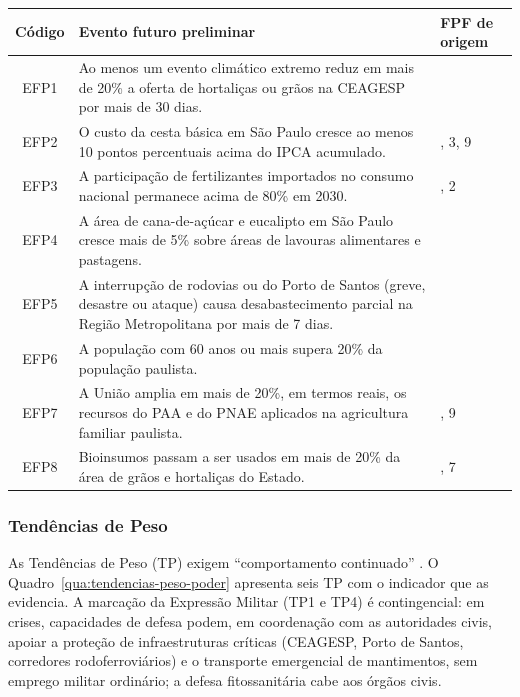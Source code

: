 \documentclass[
	12pt,				%
	openright,			%
	oneside,			%
	a4paper,			%
	chapter=TITLE,		%
	section=TITLE,		%
	english,			%
	french,				%
	spanish,			%
	brazil,				%
 ]{abntex2}
\begin{document}
\begin{quadro}[!htbp]
\centering
\caption{Eventos futuros preliminares, horizonte 2027--2030}
\label{qua:eventos-futuros-preliminares}
\footnotesize
\renewcommand{\arraystretch}{1.05}
\setlength{\tabcolsep}{3pt}
\begin{tabularx}{\textwidth}{|c|>{\raggedright\arraybackslash}X|>{\centering\arraybackslash}p{1.4cm}|}
\hline
\textbf{Código} & \textbf{Evento futuro preliminar} & \textbf{FPF de origem} \\
\hline
EFP1 & Ao menos um evento climático extremo reduz em mais de 20\% a oferta de hortaliças ou grãos na CEAGESP por mais de 30 dias. & 3 \\
\hline
EFP2 & O custo da cesta básica em São Paulo cresce ao menos 10 pontos percentuais acima do IPCA acumulado. & 1, 3, 9 \\
\hline
EFP3 & A participação de fertilizantes importados no consumo nacional permanece acima de 80\% em 2030. & 1, 2 \\
\hline
EFP4 & A área de cana-de-açúcar e eucalipto em São Paulo cresce mais de 5\% sobre áreas de lavouras alimentares e pastagens. & 8 \\
\hline
EFP5 & A interrupção de rodovias ou do Porto de Santos (greve, desastre ou ataque) causa desabastecimento parcial na Região Metropolitana por mais de 7 dias. & 4 \\
\hline
EFP6 & A população com 60 anos ou mais supera 20\% da população paulista. & 6 \\
\hline
EFP7 & A União amplia em mais de 20\%, em termos reais, os recursos do PAA e do PNAE aplicados na agricultura familiar paulista. & 5, 9 \\
\hline
EFP8 & Bioinsumos passam a ser usados em mais de 20\% da área de grãos e hortaliças do Estado. & 2, 7 \\
\hline
\end{tabularx}
\end{quadro}

\subsubsection{Tendências de Peso}
As Tendências de Peso (TP) exigem ``comportamento continuado''
\cite[p. 42--45]{esg_mpe2026}. O Quadro~\ref{qua:tendencias-peso-poder}
apresenta seis TP com o indicador que as evidencia. A marcação da Expressão
Militar (TP1 e TP4) é contingencial: em crises, capacidades de defesa podem,
em coordenação com as autoridades civis, apoiar a proteção de infraestruturas
críticas (CEAGESP, Porto de Santos, corredores rodoferroviários) e o transporte
emergencial de mantimentos, sem emprego militar ordinário; a defesa
fitossanitária cabe aos órgãos civis.
\end{document}
